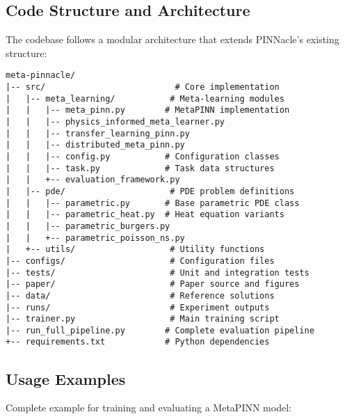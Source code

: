 \documentclass[review]{elsarticle}
\begin{document}
\subsection{Code Structure and Architecture}

The codebase follows a modular architecture that extends PINNacle's existing structure:

\begin{verbatim}
meta-pinnacle/
|-- src/                          # Core implementation
|   |-- meta_learning/           # Meta-learning modules
|   |   |-- meta_pinn.py        # MetaPINN implementation
|   |   |-- physics_informed_meta_learner.py
|   |   |-- transfer_learning_pinn.py
|   |   |-- distributed_meta_pinn.py
|   |   |-- config.py           # Configuration classes
|   |   |-- task.py             # Task data structures
|   |   +-- evaluation_framework.py
|   |-- pde/                     # PDE problem definitions
|   |   |-- parametric.py       # Base parametric PDE class
|   |   |-- parametric_heat.py  # Heat equation variants
|   |   |-- parametric_burgers.py
|   |   +-- parametric_poisson_ns.py
|   +-- utils/                   # Utility functions
|-- configs/                     # Configuration files
|-- tests/                       # Unit and integration tests
|-- paper/                       # Paper source and figures
|-- data/                        # Reference solutions
|-- runs/                        # Experiment outputs
|-- trainer.py                   # Main training script
|-- run_full_pipeline.py        # Complete evaluation pipeline
+-- requirements.txt            # Python dependencies
\end{verbatim}

\subsection{Usage Examples}

Complete example for training and evaluating a MetaPINN model:
\end{document}
